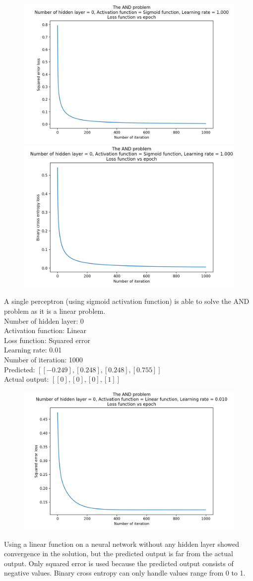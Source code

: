 \documentclass[12pt]{amsart}
\begin{document}
\begin{figure}[h]
\includegraphics[width=0.49\columnwidth]{and_sigmoid_mse.png}
\includegraphics[width=0.49\columnwidth]{and_sigmoid_bce.png}
\end{figure}

A single perceptron (using sigmoid activation function) is able to solve the AND problem as it is a linear problem. \\

Number of hidden layer: 0 \\
Activation function: Linear \\
Loss function: Squared error \\
Learning rate: 0.01\\
Number of iteration: 1000 \\
Predicted: $[[-0.249], [0.248], [0.248], [0.755]] $ \\
Actual output: $[[0],[0],[0],[1]]$

\begin{figure}[h]
\includegraphics[width=0.49\columnwidth, left]{and_linear_mse.png}
\end{figure}

Using a linear function on a neural network without any hidden layer showed convergence in the solution, but the predicted output is far from the actual output. Only squared error is used because the predicted output consists of negative values. Binary cross entropy can only handle values range from 0 to 1. \\
\end{document}
